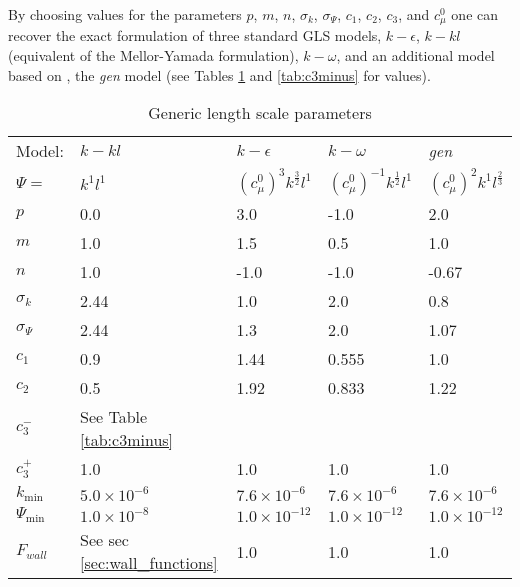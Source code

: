 By choosing values for the parameters $p$, $m$, $n$, $\sigma_k$, $\sigma_\Psi$,
$c_1$, $c_2$, $c_3$, and $c_\mu^0$ one can recover the
exact formulation of three standard GLS models, $k-\epsilon$, $k-kl$ (equivalent of the Mellor-Yamada formulation),
$k-\omega$, and an additional model based on \citet{umlauf2003}, the \emph{gen}
model (see Tables \ref{tab:glsparams} and \ref{tab:c3minus} for values).

\begin{table}[b]
\begin{center}
\begin{tabular}{lllll}\hline
Model: & $k-kl$   & $k-\epsilon$                  & $k-\omega$                       & \emph{gen}       \\
$\Psi=$& $k^1l^1$ & $\left(c_\mu^0\right)^3k^\frac{3}{2}l^1$ & $\left(c_\mu^0\right)^{-1}k^\frac{1}{2}l^1$ & $\left(c_\mu^0\right)^2k^1l^\frac{2}{3}$  \\ \hline
$p$                   & 0.0            & 3.0          & -1.0         & 2.0          \\
$m$                   & 1.0            & 1.5          &  0.5         & 1.0          \\
$n$                   & 1.0            & -1.0         & -1.0         & -0.67        \\
$\sigma_k$            & 2.44           & 1.0          & 2.0          & 0.8          \\
$\sigma_\Psi$         & 2.44           & 1.3          & 2.0          & 1.07         \\
$c_1$                 & 0.9            & 1.44         & 0.555        & 1.0          \\
$c_2$                 & 0.5            & 1.92         & 0.833        & 1.22         \\
$c_3^-$               & See Table \ref{tab:c3minus}\\
$c_3^+$               & 1.0            & 1.0          & 1.0          & 1.0          \\
$k_{\mathrm{min}}$    & $5.0\times10^{-6}$    & $7.6\times10^{-6}$  & $7.6\times10^{-6}$  & $7.6\times10^{-6}$  \\
$\Psi_{\mathrm{min}}$ & $1.0\times10^{-8}$    & $1.0\times10^{-12}$ & $1.0\times10^{-12}$ & $1.0\times10^{-12}$ \\
$F_{wall}$            & See sec \ref{sec:wall_functions} & 1.0 & 1.0 & 1.0 \\
\end{tabular}
\end{center}
\caption{Generic length scale parameters}
\label{tab:glsparams}
\end{table}

